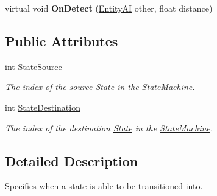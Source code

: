 \begin{DoxyCompactItemize}
\hypertarget{class_skyrates_1_1_a_i_1_1_state_1_1_state_transition_a68494fbd56a9103d424d57aaf4186ee6}{virtual void {\bfseries On\-Detect} (\hyperlink{class_skyrates_1_1_entity_1_1_entity_a_i}{Entity\-A\-I} other, float distance)}\label{class_skyrates_1_1_a_i_1_1_state_1_1_state_transition_a68494fbd56a9103d424d57aaf4186ee6}

\end{DoxyCompactItemize}
\subsection*{Public Attributes}
\begin{DoxyCompactItemize}
\item 
int \hyperlink{class_skyrates_1_1_a_i_1_1_state_1_1_state_transition_a15c97c73b5e83f2bda77c5f4fb2521c6}{State\-Source}
\begin{DoxyCompactList}\small\item\em The index of the source \hyperlink{class_skyrates_1_1_a_i_1_1_state_1_1_state}{State} in the \hyperlink{class_skyrates_1_1_a_i_1_1_state_1_1_state_machine}{State\-Machine}. \end{DoxyCompactList}\item 
int \hyperlink{class_skyrates_1_1_a_i_1_1_state_1_1_state_transition_a445177b14011fbc85aec78ecd04680f8}{State\-Destination}
\begin{DoxyCompactList}\small\item\em The index of the destination \hyperlink{class_skyrates_1_1_a_i_1_1_state_1_1_state}{State} in the \hyperlink{class_skyrates_1_1_a_i_1_1_state_1_1_state_machine}{State\-Machine}. \end{DoxyCompactList}\end{DoxyCompactItemize}


\subsection{Detailed Description}
Specifies when a state is able to be transitioned into. 



